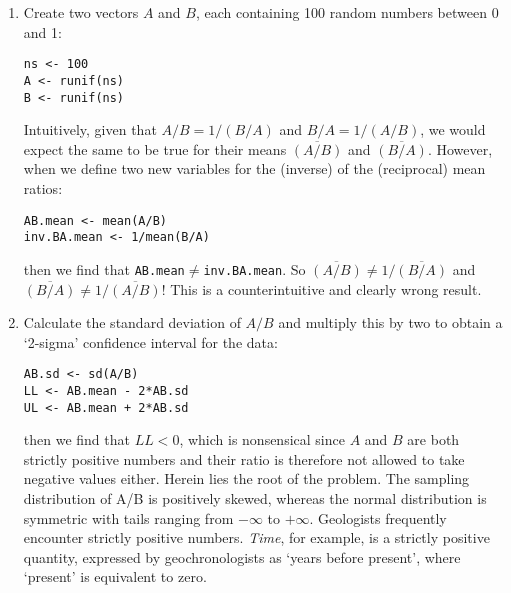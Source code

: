 \documentclass[11pt]{article}
\begin{document}
\begin{enumerate}

\item Create two vectors $A$ and $B$, each containing 100 random
  numbers between 0 and 1:

\begin{verbatim}
ns <- 100
A <- runif(ns)
B <- runif(ns)
\end{verbatim}

Intuitively, given that $A/B=1/(B/A)$ and $B/A=1/(A/B)$, we would
expect the same to be true for their means $\overline{(A/B)}$ and
$\overline{(B/A)}$. However, when we define two new variables for the
(inverse) of the (reciprocal) mean ratios:

\begin{verbatim}
AB.mean <- mean(A/B)
inv.BA.mean <- 1/mean(B/A)
\end{verbatim}

then we find that \texttt{AB.mean}$\neq$\texttt{inv.BA.mean}. So
$\overline{(A/B)}\neq1/\overline{(B/A)}$ and
$\overline{(B/A)}\neq1/\overline{(A/B)}$!  This is a counterintuitive
and clearly wrong result.

\item Calculate the standard deviation of $A/B$ and multiply this by
  two to obtain a `2-sigma' confidence interval for the data:

\begin{verbatim}
AB.sd <- sd(A/B)
LL <- AB.mean - 2*AB.sd
UL <- AB.mean + 2*AB.sd
\end{verbatim}

then we find that $LL < 0$, which is nonsensical since $A$ and $B$ are
both strictly positive numbers and their ratio is therefore not
allowed to take negative values either.  Herein lies the root of the
problem. The sampling distribution of A/B is positively skewed,
whereas the normal distribution is symmetric with tails ranging from
$-\infty$ to $+\infty$.  Geologists frequently encounter strictly
positive numbers. \emph{Time}, for example, is a strictly positive
quantity, expressed by geochronologists as `years before present',
where `present' is equivalent to zero.


\end{enumerate}
\end{document}
